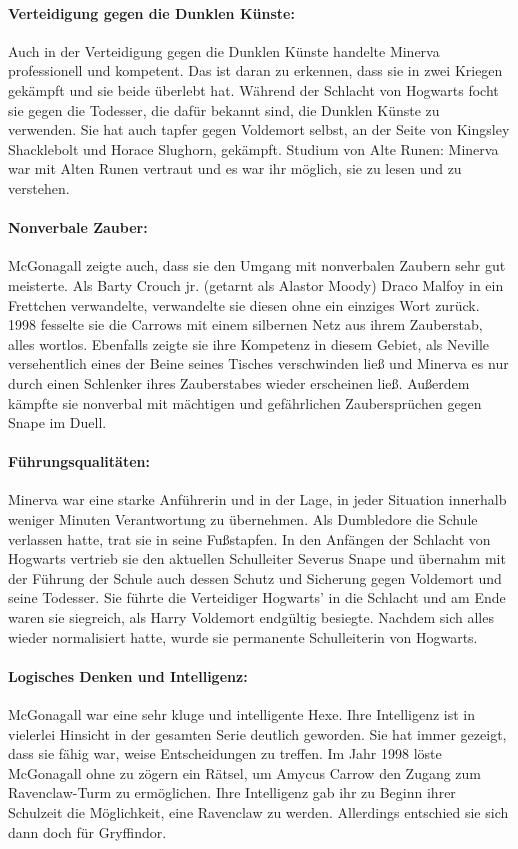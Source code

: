\documentclass[a4paper, 10pt]{article}
\begin{document}
\paragraph{Verteidigung gegen die Dunklen Künste:} 
Auch in der Verteidigung gegen die Dunklen Künste handelte Minerva professionell und kompetent. Das ist daran zu erkennen, dass sie in zwei Kriegen gekämpft und sie beide überlebt hat. Während der Schlacht von Hogwarts focht sie gegen die Todesser, die dafür bekannt sind, die Dunklen Künste zu verwenden. Sie hat auch tapfer gegen Voldemort selbst, an der Seite von Kingsley Shacklebolt und Horace Slughorn, gekämpft.
Studium von Alte Runen: Minerva war mit Alten Runen vertraut und es war ihr möglich, sie zu lesen und zu verstehen. 
\paragraph{Nonverbale Zauber:}
McGonagall zeigte auch, dass sie den Umgang mit nonverbalen Zaubern sehr gut meisterte. Als Barty Crouch jr. (getarnt als Alastor Moody) Draco Malfoy in ein Frettchen verwandelte, verwandelte sie diesen ohne ein einziges Wort zurück. 1998 fesselte sie die Carrows mit einem silbernen Netz aus ihrem Zauberstab, alles wortlos. Ebenfalls zeigte sie ihre Kompetenz in diesem Gebiet, als Neville versehentlich eines der Beine seines Tisches verschwinden ließ und Minerva es nur durch einen Schlenker ihres Zauberstabes wieder erscheinen ließ. Außerdem kämpfte sie nonverbal mit mächtigen und gefährlichen Zaubersprüchen gegen Snape im Duell.
\paragraph{Führungsqualitäten:} 
Minerva war eine starke Anführerin und in der Lage, in jeder Situation innerhalb weniger Minuten Verantwortung zu übernehmen. Als Dumbledore die Schule verlassen hatte, trat sie in seine Fußstapfen. In den Anfängen der Schlacht von Hogwarts vertrieb sie den aktuellen Schulleiter Severus Snape und übernahm mit der Führung der Schule auch dessen Schutz und Sicherung gegen Voldemort und seine Todesser. Sie führte die Verteidiger Hogwarts' in die Schlacht und am Ende waren sie siegreich, als Harry Voldemort endgültig besiegte. Nachdem sich alles wieder normalisiert hatte, wurde sie permanente Schulleiterin von Hogwarts.
\paragraph{Logisches Denken und Intelligenz:}
McGonagall war eine sehr kluge und intelligente Hexe. Ihre Intelligenz ist in vielerlei Hinsicht in der gesamten Serie deutlich geworden. Sie hat immer gezeigt, dass sie fähig war, weise Entscheidungen zu treffen. Im Jahr 1998 löste McGonagall ohne zu zögern ein Rätsel, um Amycus Carrow den Zugang zum Ravenclaw-Turm zu ermöglichen. Ihre Intelligenz gab ihr zu Beginn ihrer Schulzeit die Möglichkeit, eine Ravenclaw zu werden. Allerdings entschied sie sich dann doch für Gryffindor.
\end{document}
